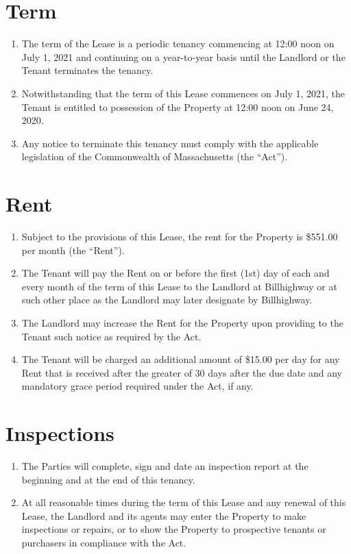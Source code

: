 \documentclass[12pt]{article}
\begin{document}
    
\section*{Term}

\begin{enumerate}[resume]
    \item The term of the Lease is a periodic tenancy commencing at 12:00 noon
	    on July 1, 2021 and continuing on a year-to-year basis until the
		Landlord or the Tenant terminates the tenancy.
    \item Notwithstanding that the term of this Lease commences on July 1,
	    2021, the Tenant is entitled to possession of the Property at 12:00
		noon on June 24, 2020.
   \item  Any notice to terminate this tenancy must comply with the applicable
	   legislation of the Commonwealth of Massachusetts (the ``Act'').
\end{enumerate}
   
\section*{Rent}

\begin{enumerate}[resume]
    \item Subject to the provisions of this Lease, the rent for the Property is
	    \$551.00 per month (the ``Rent'').
    \item The Tenant will pay the Rent on or before the first (1st) day of each
	    and every month of the term of this Lease to the Landlord at
		Billhighway or at such other place as the Landlord may later
		designate by Billhighway.
    \item The Landlord may increase the Rent for the Property upon providing to
	    the Tenant such notice as required by the Act.
    \item The Tenant will be charged an additional amount of \$15.00 per day
	    for any Rent that is received after the greater of 30 days after
		the due date and any mandatory grace period required under the
		Act, if any.
\end{enumerate}
    
\section*{Inspections}

\begin{enumerate}[resume]
    \item The Parties will complete, sign and date an inspection report at the
	    beginning and at the end of this tenancy.
    \item At all reasonable times during the term of this Lease and any renewal
	    of this Lease, the Landlord and its agents may enter the Property
		to make inspections or repairs, or to show the Property to
		prospective tenants or purchasers in compliance with the Act.
\end{enumerate}
    
\end{document}
